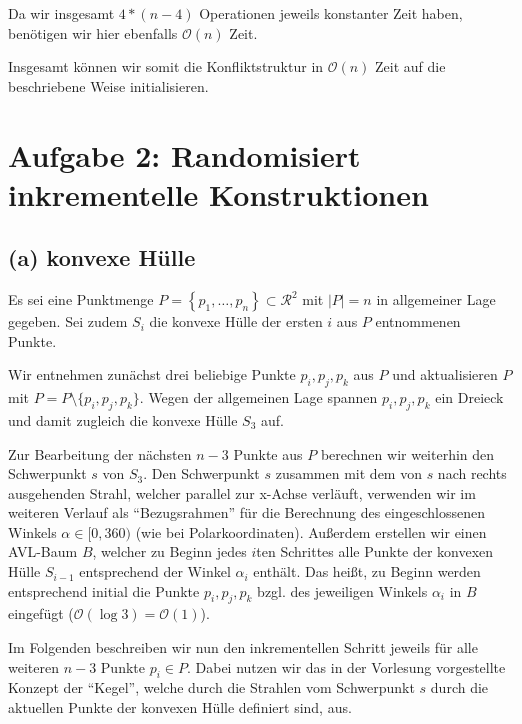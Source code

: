 \documentclass[a4paper]{article}
\begin{document}
Da wir insgesamt $4 * (n-4)$ Operationen jeweils konstanter Zeit haben, benötigen
wir hier ebenfalls $\mathcal{O}(n)$ Zeit.

Insgesamt können wir somit die Konfliktstruktur in $\mathcal{O}(n)$ Zeit auf die beschriebene Weise initialisieren.









\section*{Aufgabe 2: Randomisiert inkrementelle Konstruktionen}



\subsection*{(a) konvexe Hülle}



Es sei eine Punktmenge $P = \left\{p_1, \dots, p_n\right\} \subset \mathcal{R}^2$ mit $|P| = n$ in allgemeiner Lage gegeben. Sei zudem $S_i$ die konvexe Hülle der ersten $i$ aus $P$
entnommenen Punkte.

Wir entnehmen zunächst drei beliebige Punkte $p_i, p_j, p_k$ aus $P$ und aktualisieren
$P$ mit $P = P \setminus \{p_i, p_j, p_k\}$. Wegen der allgemeinen Lage  spannen $p_i, p_j, p_k$
ein Dreieck und damit zugleich die konvexe Hülle $S_3$ auf. 

Zur Bearbeitung der nächsten
$n-3$ Punkte aus $P$ berechnen wir weiterhin den Schwerpunkt $s$ von $S_3$.
Den Schwerpunkt $s$ zusammen mit dem von $s$ nach rechts ausgehenden Strahl, welcher parallel zur x-Achse verläuft,
verwenden wir im weiteren Verlauf als "`Bezugsrahmen"' für die Berechnung des eingeschlossenen Winkels $\alpha \in [0,360)$ (wie bei Polarkoordinaten).
Außerdem erstellen wir einen AVL-Baum $B$, welcher zu Beginn jedes $i$ten Schrittes alle Punkte der konvexen Hülle $S_{i-1}$ entsprechend
der Winkel $\alpha_i$ enthält. Das heißt, zu Beginn werden entsprechend initial die Punkte $p_i, p_j, p_k$ bzgl. des jeweiligen Winkels $\alpha_i$ 
in $B$ eingefügt ($\mathcal{O}(\log 3) = \mathcal{O}(1)$).

Im Folgenden beschreiben wir nun den inkrementellen Schritt jeweils für alle weiteren $n-3$ Punkte $p_i \in P$.
Dabei nutzen wir das in der Vorlesung vorgestellte Konzept der "`Kegel"', welche durch die Strahlen 
vom Schwerpunkt $s$ durch die aktuellen Punkte der konvexen Hülle definiert sind, aus.
\end{document}
